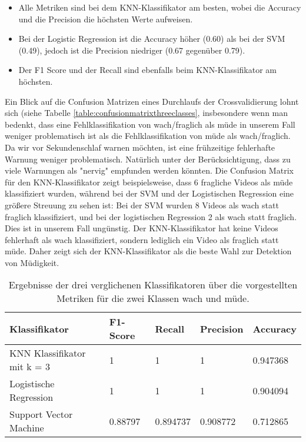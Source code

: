 \begin{itemize}
\item Alle Metriken sind bei dem KNN-Klassifikator am besten, wobei die Accuracy und die Precision die höchsten Werte aufweisen.
\item Bei der Logistic Regression ist die Accuracy höher (0.60) als bei der SVM (0.49), jedoch ist die Precision niedriger (0.67 gegenüber 0.79).
\item Der F1 Score und der Recall sind ebenfalls beim KNN-Klassifikator am höchsten.
\end{itemize}

Ein Blick auf die Confusion Matrizen eines Durchlaufs der Crossvalidierung lohnt sich (siehe Tabelle \ref{table:confusionmatrixthreeclasses}, insbesondere wenn man bedenkt, dass eine Fehlklassifikation von wach/fraglich als müde in unserem Fall weniger problematisch ist als die Fehlklassifikation von müde als wach/fraglich. Da wir vor Sekundenschlaf warnen möchten, ist eine frühzeitige fehlerhafte Warnung weniger problematisch. Natürlich unter der Berücksichtigung, dass zu viele Warnungen als "nervig" empfunden werden könnten. Die Confusion Matrix für den KNN-Klassifikator zeigt beispielsweise, dass 6 fragliche Videos als müde klassifiziert wurden, während bei der SVM und der Logistischen Regression eine größere Streuung zu sehen ist: Bei der SVM wurden 8 Videos als wach statt fraglich klassifiziert, und bei der logistischen Regression 2 als wach statt fraglich. Dies ist in unserem Fall ungünstig. Der KNN-Klassifikator hat keine Videos fehlerhaft als wach klassifiziert, sondern lediglich ein Video als fraglich statt müde. Daher zeigt sich der KNN-Klassifikator als die beste Wahl zur Detektion von Müdigkeit.

\begin{table}
    \centering
    \begin{tabular}{|l|l|l|l|l|}
    \hline
        {Klassifikator} & {F1-Score} & {Recall} & {Precision} & {Accuracy} \\ \hline
        {KNN Klassifikator mit k = 3} & 1 & 1 & 1 & 0.947368 \\ \hline
        {Logistische Regression} & 1 & 1 & 1 & 0.904094 \\ \hline
        {Support Vector Machine} & 0.88797 & 0.894737 & 0.908772 & 0.712865 \\ \hline
    \end{tabular}
\caption{Ergebnisse der drei verglichenen Klassifikatoren über die vorgestellten Metriken für die zwei Klassen wach und müde.}
\label{table:twoclassificator}
\end{table}

